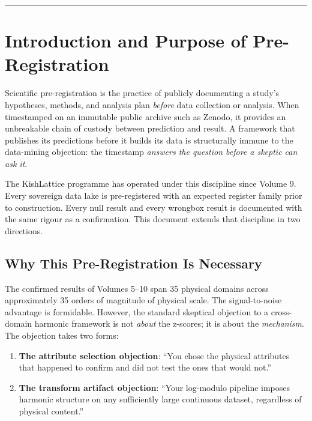 \documentclass[12pt,a4paper]{article}
\begin{document}
\vspace{1em}
\hrule

\tableofcontents
\newpage

\section{Introduction and Purpose of Pre-Registration}
\label{sec:intro}

Scientific pre-registration is the practice of publicly documenting a study's
hypotheses, methods, and analysis plan \emph{before} data collection or
analysis. When timestamped on an immutable public archive such as Zenodo, it
provides an unbreakable chain of custody between prediction and result. A
framework that publishes its predictions before it builds its data is
structurally immune to the data-mining objection: the timestamp \emph{answers
the question before a skeptic can ask it}.

The KishLattice programme has operated under this discipline since Volume 9.
Every sovereign data lake is pre-registered with an expected register family
prior to construction. Every null result and every wrongbox result is documented
with the same rigour as a confirmation. This document extends that discipline in
two directions.

\subsection{Why This Pre-Registration Is Necessary}

The confirmed results of Volumes 5--10 span 35 physical domains across
approximately 35 orders of magnitude of physical scale. The signal-to-noise
advantage is formidable. However, the standard skeptical objection to a
cross-domain harmonic framework is not \emph{about} the z-scores; it is about
the \emph{mechanism}. The objection takes two forms:

\begin{enumerate}
  \item \textbf{The attribute selection objection}: ``You chose the physical
  attributes that happened to confirm and did not test the ones that would
  not.''
  \item \textbf{The transform artifact objection}: ``Your log-modulo pipeline
  imposes harmonic structure on any sufficiently large continuous dataset,
  regardless of physical content.''
\end{enumerate}
\end{document}
